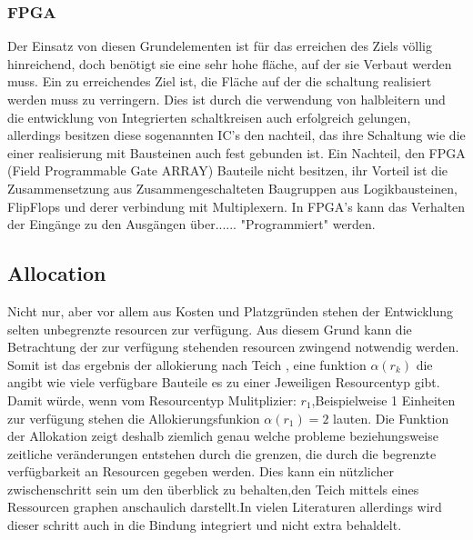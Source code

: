 \documentclass[conference]{IEEEtran}
\begin{document}
\subsubsection{FPGA}
Der Einsatz von diesen Grundelementen ist für das erreichen des Ziels völlig hinreichend, doch benötigt sie eine sehr hohe fläche, auf der sie Verbaut werden muss. Ein zu erreichendes Ziel ist, die Fläche auf der die schaltung realisiert werden muss zu verringern. Dies ist durch die verwendung von halbleitern und die entwicklung von Integrierten schaltkreisen auch erfolgreich gelungen, allerdings besitzen diese sogenannten IC's den nachteil, das ihre Schaltung wie die einer realisierung mit Bausteinen auch fest gebunden ist. Ein Nachteil, den FPGA (Field Programmable Gate ARRAY) Bauteile nicht besitzen, ihr Vorteil ist die Zusammensetzung aus Zusammengeschalteten Baugruppen aus Logikbausteinen, FlipFlops und derer verbindung mit Multiplexern. In FPGA's kann das Verhalten der Eingänge zu den Ausgängen über...... "Programmiert" werden.
\subsection{Allocation}






Nicht nur, aber vor allem aus Kosten und Platzgründen stehen der Entwicklung selten unbegrenzte resourcen zur verfügung. Aus diesem Grund kann die Betrachtung der zur verfügung stehenden resourcen zwingend notwendig werden. Somit ist das ergebnis der allokierung nach Teich \cite{1}    
, eine funktion $ \alpha(r_k)$ die angibt wie viele verfügbare Bauteile es zu einer Jeweiligen Resourcentyp gibt.\\
Damit würde, wenn vom Resourcentyp Mulitplizier: $r_1$,Beispielweise 1 Einheiten zur verfügung stehen die Allokierungsfunkion $\alpha(r_1) = 2$ lauten. Die Funktion der Allokation zeigt deshalb ziemlich genau welche probleme beziehungsweise zeitliche veränderungen entstehen durch die grenzen, die durch die begrenzte verfügbarkeit an Resourcen gegeben werden. Dies kann ein nützlicher zwischenschritt sein um den überblick zu behalten,den Teich mittels eines Ressourcen graphen anschaulich darstellt.In vielen Literaturen allerdings wird dieser schritt auch in die Bindung integriert und nicht extra behaldelt.
\end{document}
